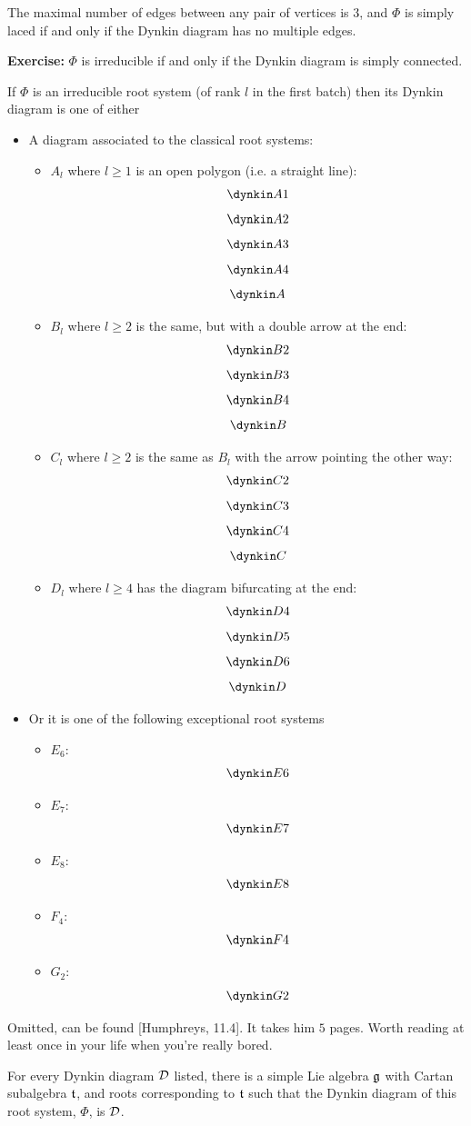 \documentclass{article}
\begin{document}
\begin{remark*}
    The maximal number of edges between any pair of vertices is $3$, and $\Phi$ is simply laced if and only if the Dynkin diagram has no multiple edges.
\end{remark*}
\textbf{Exercise:} $\Phi$ is irreducible if and only if the Dynkin diagram is simply connected.
\begin{fancythm}{}
    If $\Phi$ is an irreducible root system (of rank $l$ in the first batch) then its Dynkin diagram is one of either \begin{itemize}
        \item A diagram associated to the classical root systems: \begin{itemize}
            \item $A_{l}$ where $l \geq 1$ is an open polygon (i.e. a straight line): \[ \dynkin A1 \] \[\dynkin A2\] \[\dynkin A3\] \[\dynkin A4\] \[ \dynkin A{}\]
            \item $B_{l}$ where $l\geq 2$ is the same, but with a double arrow at the end: \[ \dynkin B2\] \[\dynkin B3\] \[\dynkin B4\] \[ \dynkin B{}\]
            \item $C_{l}$ where $l\geq 2$ is the same as $B_{l}$ with the arrow pointing the other way: \[ \dynkin C2\] \[\dynkin C3\] \[ \dynkin C4\] \[ \dynkin C{}\]
            \item $D_{l}$ where $l \geq 4$ has the diagram bifurcating at the end: \[ \dynkin D4\] \[\dynkin D5\] \[\dynkin D6\] \[ \dynkin D{}\]
        \end{itemize}
        \item Or it is one of the following exceptional root systems \begin{itemize}
            \item $E_{6}$: \[ \dynkin E6\]
            \item $E_{7}$: \[ \dynkin E7\] 
            \item $E_{8}$: \[ \dynkin E8\]
            \item $F_{4}$: \[ \dynkin F4\]
            \item $G_{2}$: \[ \dynkin G2\]
        \end{itemize}
    \end{itemize}
\end{fancythm}
\proof Omitted, can be found [Humphreys, 11.4]. It takes him $5$ pages. Worth reading at least once in your life when you're really bored.
\endproof 
\begin{fancythm}{}
    For every Dynkin diagram $\mathcal{D}$ listed, there is a simple Lie algebra $\mathfrak{g}$ with Cartan subalgebra $\mathfrak{t}$, and roots corresponding to $\mathfrak{t}$ such that the Dynkin diagram of this root system, $\Phi$, is $\mathcal{D}$.
\end{fancythm}
\end{document}
